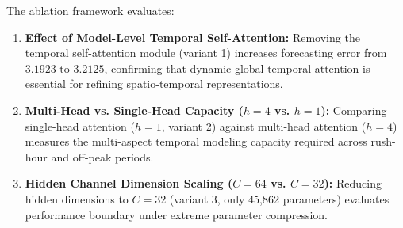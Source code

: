 The ablation framework evaluates:
\begin{enumerate}
    \item \textbf{Effect of Model-Level Temporal Self-Attention:} Removing the temporal self-attention module (variant 1) increases forecasting error from $3.1923$ to $3.2125$, confirming that dynamic global temporal attention is essential for refining spatio-temporal representations.
    \item \textbf{Multi-Head vs. Single-Head Capacity ($h=4$ vs. $h=1$):} Comparing single-head attention ($h=1$, variant 2) against multi-head attention ($h=4$) measures the multi-aspect temporal modeling capacity required across rush-hour and off-peak periods.
    \item \textbf{Hidden Channel Dimension Scaling ($C=64$ vs. $C=32$):} Reducing hidden dimensions to $C=32$ (variant 3, only 45,862 parameters) evaluates performance boundary under extreme parameter compression.
\end{enumerate}
